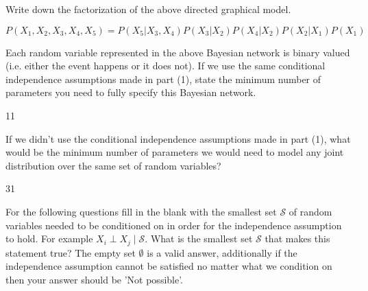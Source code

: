 \documentclass[11pt,addpoints,answers]{exam}
\begin{document}
\begin{questions}
\question[1] Write down the factorization of the above directed graphical model.

\begin{tcolorbox}[fit,height=1cm, width=15cm, blank, borderline={1pt}{-2pt},nobeforeafter]
$$P(X_1, X_2, X_3, X_4, X_5) = P(X_5 \big| X_3, X_4)P(X_3 \big| X_2)P(X_4 \big| X_2)P(X_2 \big| X_1)P(X_1)$$
\end{tcolorbox}

\question[1] Each random variable represented in the above Bayesian network is binary valued (i.e. either the event happens or it does not). If we use the same conditional independence assumptions made in part (1), state the minimum number of parameters you need to fully specify  this Bayesian network.

\begin{tcolorbox}[fit,height=1cm, width=2cm, blank, borderline={1pt}{-2pt},nobeforeafter]
\vspace{10pt}
\hspace{10pt}
11
\end{tcolorbox}


\question[1] If we didn't use the conditional independence assumptions made in part (1), what would be the minimum number of parameters we would need to model any joint distribution over the same set of random variables?

\begin{tcolorbox}[fit,height=1cm, width=2cm, blank, borderline={1pt}{-2pt},nobeforeafter]
\vspace{10pt}
\hspace{10pt}
31
\end{tcolorbox}



\newpage
\question[5] For the following questions fill in the blank with the smallest set $\mathcal{S}$ of random variables needed to be conditioned on in order for the independence assumption to hold. For example $X_i \perp X_j \mid \mathcal{S}$. What is the smallest set $\mathcal{S}$ that makes this statement true? The empty set $\emptyset$ is a valid answer, additionally if the independence assumption cannot be satisfied no matter what we condition on then your answer should be 'Not possible'.
\end{questions}
\end{document}
